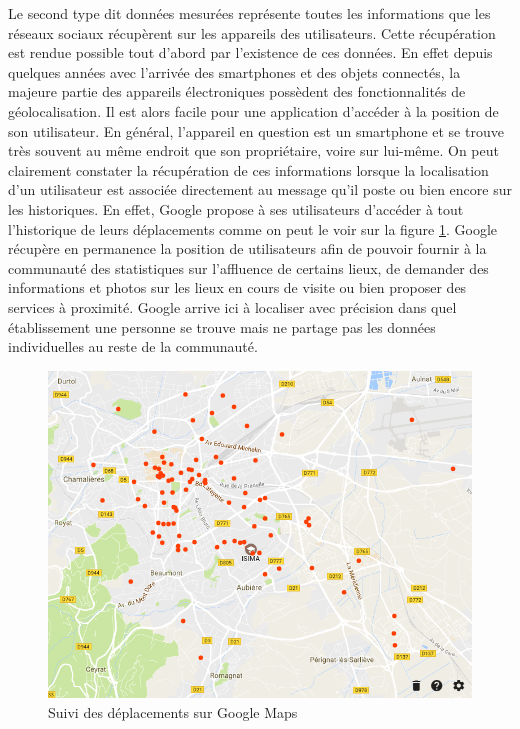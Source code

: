 Le second type dit données mesurées représente toutes les informations que les réseaux sociaux récupèrent sur les appareils des utilisateurs. Cette récupération est rendue possible tout d’abord par l’existence de ces données. En effet depuis quelques années avec l’arrivée des smartphones et des objets connectés, la majeure partie des appareils électroniques possèdent des fonctionnalités de géolocalisation. Il est alors facile pour une application d’accéder à la position de son utilisateur. En général, l’appareil en question est un smartphone et se trouve très souvent au même endroit que son propriétaire, voire sur lui-même. On peut clairement constater la récupération de ces informations lorsque la localisation d’un utilisateur est associée directement au message qu’il poste ou bien encore sur les historiques. En effet, Google propose à ses utilisateurs d’accéder à tout l’historique de leurs déplacements \cite{bibgoogle} comme on peut le voir sur la figure \ref{google-maps}. Google récupère en permanence la position de utilisateurs afin de pouvoir fournir à la communauté des statistiques sur l’affluence de certains lieux, de demander des informations et photos sur les lieux en cours de visite ou bien proposer des services à proximité. Google arrive ici à localiser avec précision dans quel établissement une personne se trouve mais ne partage pas les données individuelles au reste de la communauté.

\begin{figure}[H]
    \centering
    \includegraphics[width=\textwidth]{./img/googlemaps.png}
    \caption{Suivi des déplacements sur Google Maps}
    \label{google-maps}
\end{figure}

